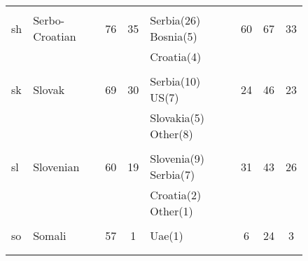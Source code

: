 \begin{figure}[h]
\begin{tabular}{llcclccc}
&&&&&&&\\
sh&Serbo-Croatian&76&35&Serbia(26) Bosnia(5) &60&67&33\\
&&&&Croatia(4) &&&\\
&&&&&&&\\
sk&Slovak&69&30&Serbia(10) US(7) &24&46&23\\
&&&&Slovakia(5) Other(8) &&&\\
&&&&&&&\\
sl&Slovenian&60&19&Slovenia(9) Serbia(7) &31&43&26\\
&&&&Croatia(2) Other(1) &&&\\
&&&&&&&\\
so&Somali&57&1&Uae(1) &6&24&3\\
&&&&&&&\\
&&&&&&&\\
\end{tabular}
\end{figure}
\clearpage
